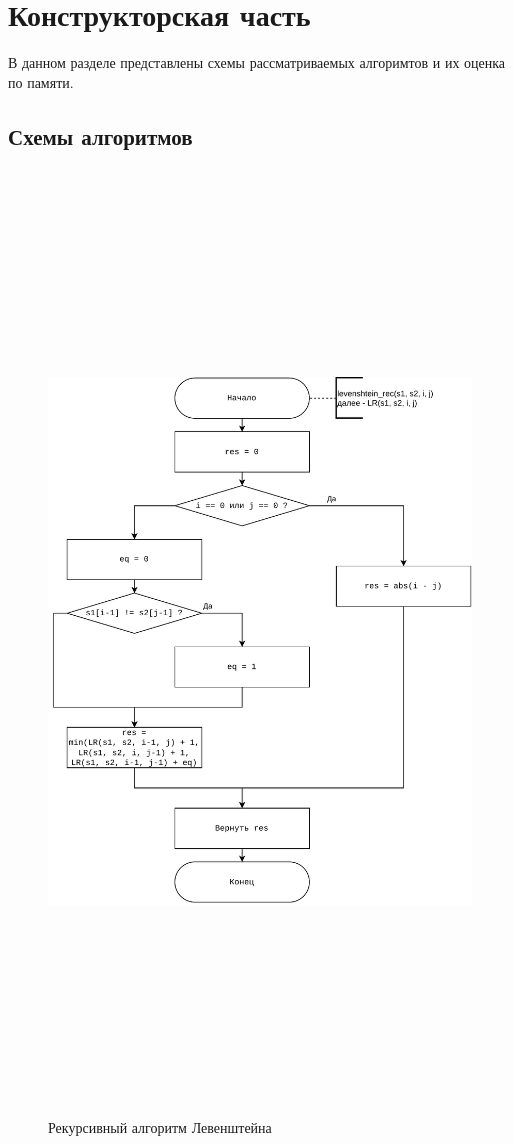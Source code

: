 \chapter{Конструкторская часть}

    В данном разделе представлены схемы рассматриваемых алгоримтов и их оценка по памяти.
    
    \section{Схемы алгоритмов}
    
        \begin{figure}
            \centering
            \includegraphics[width=15cm,height=25cm,keepaspectratio]{images/leven_rec.pdf}
            \caption{Рекурсивный алгоритм Левенштейна}
            \label{fig:leven_rec}
        \end{figure}
        
